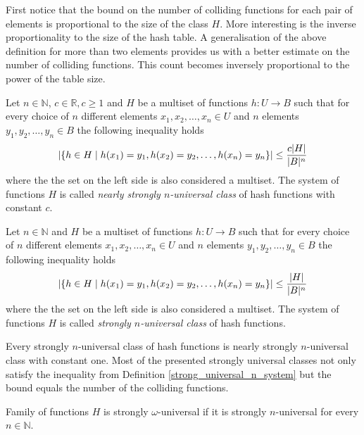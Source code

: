 First notice that the bound on the number of colliding functions for each pair of elements is proportional to the size of the class $H$. More interesting is the inverse proportionality to the size of the hash table. A generalisation of the above definition for more than two elements provides us with a better estimate on the number of colliding functions. This count becomes inversely proportional to the power of the table size.

\begin{definition}
\label{nearly_strong_universal_n_system}
Let $n \in \mathbb{N}$, $c \in \mathbb{R}, c \geq 1$ and $H$ be a multiset of functions $h: U \rightarrow B$ such that for every choice of $n$ different elements $x_1, x_2, \dots, x_n \in U$ and $n$ elements $y_1, y_2, \dots, y_n \in B$ the following inequality holds
\[ 
	\left|\lbrace h \in H \mid h(x_1) = y_1, h(x_2) = y_2, \dots, h(x_n) = y_n \rbrace \right| \leq \frac{c|H|}{|B|^n}
\] 
where the the set on the left side is also considered a multiset. The system of functions $H$ is called \emph{nearly strongly $n$-universal class} of hash functions with constant $c$.
\end{definition}

\begin{definition}
\label{strong_universal_n_system}
Let $n \in \mathbb{N}$ and $H$ be a multiset of functions $h: U \rightarrow B$ such that for every choice of $n$ different elements $x_1, x_2, \dots, x_n \in U$ and $n$ elements $y_1, y_2, \dots, y_n \in B$ the following inequality holds
\[ 
	\left|\lbrace h \in H \mid h(x_1) = y_1, h(x_2) = y_2, \dots, h(x_n) = y_n \rbrace \right| \leq \frac{|H|}{|B|^n}
\] 
where the the set on the left side is also considered a multiset. The system of functions $H$ is called \emph{strongly $n$-universal class} of hash functions.
\end{definition}

Every strongly $n$-universal class of hash functions is nearly strongly $n$-universal class with constant one. Most of the presented strongly universal classes not only satisfy the inequality from Definition \ref{strong_universal_n_system} but the bound equals the number of the colliding functions.

\begin{definition}
\label{strong_universal_omega_system}
Family of functions $H$ is strongly $\omega$-universal if it is strongly $n$-universal for every $n \in \mathbb{N}$.
\end{definition}

